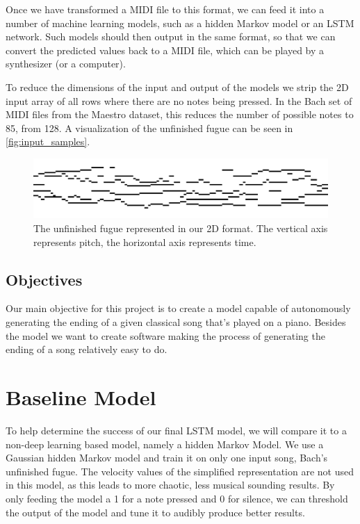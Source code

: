 \documentclass[11pt, twocolumn]{article}
\begin{document}
Once we have transformed a MIDI file to this format, we can feed it into a number of machine learning models, such as a hidden Markov model or an LSTM network. Such models should then output in the same format, so that we can convert the predicted values back to a MIDI file, which can be played by a synthesizer (or a computer).

To reduce the dimensions of the input and output of the models we strip the 2D input array of all rows where there are no notes being pressed. In the Bach set of MIDI files from the Maestro dataset, this reduces the number of possible notes to 85, from 128. A visualization of the unfinished fugue can be seen in \autoref{fig:input_samples}.


\begin{figure}[ht]
    \centering
    \includegraphics[width=\linewidth]{images/unfin_array.png}
    \caption{The unfinished fugue represented in our 2D format. The vertical axis represents pitch, the horizontal axis represents time.}
    \label{fig:input_samples}
\end{figure}
    
\subsection{Objectives}
Our main objective for this project is to create a model capable of autonomously generating the ending of a given classical song that's played on a piano. Besides the model we want to create software making the process of generating the ending of a song relatively easy to do.

\section{Baseline Model}
To help determine the success of our final LSTM model, we will compare it to a non-deep learning based model, namely a hidden Markov Model. We use a Gaussian hidden Markov model and train it on only one input song, Bach's unfinished fugue. The velocity values of the simplified representation are not used in this model, as this leads to more chaotic, less musical sounding results. By only feeding the model a 1 for a note pressed and 0 for silence, we can threshold the output of the model and tune it to audibly produce better results.
\end{document}
